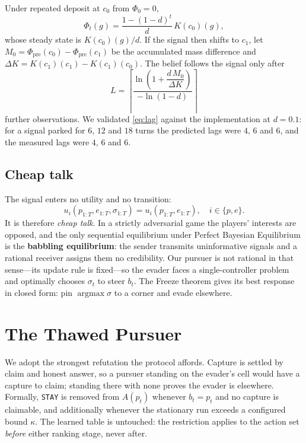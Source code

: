 \documentclass[conference]{IEEEtran}
\begin{document}
Under repeated deposit at $c_0$ from $\Phi_0 = 0$,
\begin{equation}
\Phi_t(g) = \frac{1-(1-d)^t}{d}\,K(c_0)(g),
\end{equation}
whose steady state is $K(c_0)(g)/d$. If the signal then shifts to $c_1$, let
$M_0 = \Phi_{\mathrm{pre}}(c_0) - \Phi_{\mathrm{pre}}(c_1)$ be the accumulated
mass difference and $\Delta K = K(c_1)(c_1) - K(c_1)(c_0)$. The belief follows
the signal only after
\begin{equation}
L = \left\lceil
\frac{\ln\!\left(1 + \dfrac{d\,M_0}{\Delta K}\right)}{-\ln(1-d)}
\right\rceil
\label{eq:lag}
\end{equation}
further observations. We validated \eqref{eq:lag} against the implementation
at $d = 0.1$: for a signal parked for $6$, $12$ and $18$ turns the predicted
lags were $4$, $6$ and $6$, and the measured lags were $4$, $6$ and $6$.

\subsection{Cheap talk}

The signal enters no utility and no transition:
\begin{equation}
u_i(p_{1:T}, e_{1:T}, \sigma_{1:T}) = u_i(p_{1:T}, e_{1:T}),
\quad i \in \{p, e\}.
\end{equation}
It is therefore \emph{cheap talk}. In a strictly adversarial game the
players' interests are opposed, and the only sequential equilibrium under
Perfect Bayesian Equilibrium is the \textbf{babbling equilibrium}: the sender
transmits uninformative signals and a rational receiver assigns them no
credibility. Our pursuer is not rational in that sense---its update rule is
fixed---so the evader faces a single-controller problem and optimally chooses
$\sigma_t$ to steer $b_t$. The Freeze theorem gives its best response in
closed form: pin $\operatorname{argmax}\sigma$ to a corner and evade
elsewhere.

\section{The Thawed Pursuer}

We adopt the strongest refutation the protocol affords. Capture is settled by
claim and honest answer, so a pursuer standing on the evader's cell would have
a capture to claim; standing there with none proves the evader is elsewhere.
Formally, \texttt{STAY} is removed from $A(p_t)$ whenever $b_t = p_t$ and no
capture is claimable, and additionally whenever the stationary run exceeds a
configured bound $\kappa$. The learned table is untouched: the restriction
applies to the action set \emph{before} either ranking stage, never after.
\end{document}

